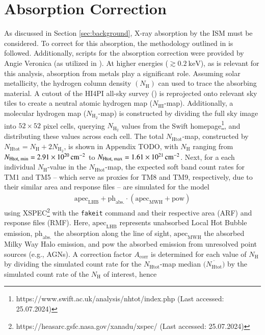 \section{Absorption Correction}
As discussed in Section \ref{sec:background}, X-ray absorption by the ISM must be considered. To correct for this absorption, the methodology outlined in \cite{Willingale2013} is followed. Additionally, scripts for the absorption correction were provided by Angie Veronica (as utilized in \cite{veronica2020}). At higher energies (\(\gtrsim \SI{0.2}{\kilo\electronvolt}\)), as is relevant for this analysis, absorption from metals play a significant role. 
Assuming solar metallicity, the hydrogen column density \({\textstyle (N_\text{H})}\) can used to trace the absorbing material. A cutout of the HI4PI all-sky survey (\cite{HI4PI2016}) is reprojected onto relevant sky tiles to create a neutral atomic hydrogen map (\({\textstyle N_{\text{HI}}}\)-map). Additionally, a molecular hydrogen map (\({\textstyle N_{\text{H}_2}}\)-map) is constructed by dividing the full sky image into \(52 \times 52\) pixel cells, querying \({\textstyle N_{\text{H}_2}}\) values from the Swift homepage\footnote{https://www.swift.ac.uk/analysis/nhtot/index.php (Last accessed: 25.07.2024)}, and distributing these values across each cell. The total \({\textstyle N_{\text{Htot}}}\)-map, constructed by \({\textstyle N_{\text{Htot}} = N_{\text{H}} + 2N_{\text{H}_2}}\), is shown in Appendix TODO, with \({\textstyle N_{\text{H}}}\) ranging from \({\textstyle N_\text{Htot, min} = \SI{2.91e+20}{{\centi\meter}^{-2}}}\) to \({\textstyle N_\text{Htot, max} = \SI{1.61e+21}{{\centi\meter}^{-2}}}\).
Next, for a each individual \({\textstyle N_{\text{H}}}\)-value in the \({\textstyle N_{\text{Htot}}}\)-map, the expected soft band count rates for TM1 and TM5 -- which serve as proxies for TM8 and TM9, respectively, due to their similar area and response files -- are simulated for the model
\begin{align*}
    \text{apec}_{\text{LHB}} + \text{ph}_\text{abs.}\cdot(\text{apec}_{\text{MWH}} + \text{pow})
\end{align*}
using XSPEC\footnote{https://heasarc.gsfc.nasa.gov/xanadu/xspec/ (Last accessed: 25.07.2024)} with the \texttt{fakeit} command and their respective area (ARF) and response files (RMF). Here, \(\text{apec}_{\text{LHB}}\) represents unabsorbed Local Hot Bubble emission, \(\text{ph}_\text{abs.}\) the absorption along the line of sight, \(\text{apec}_{\text{MWH}}\) the absorbed Milky Way Halo emission, and \(\text{pow}\) the absorbed emission from unresolved point sources (e.g., AGNs). A correction factor \(A_{\text{corr}}\) is determined for each value of \(N_\text{H}\) by dividing the simulated count rate for the \({\textstyle N_{\text{Htot}}}\)-map median \({\textstyle \bigl(\overline{N_{\text{Htot}}}\bigr)}\) by the simulated count rate of the \({\textstyle N_{\text{H}}}\) of interest, hence
